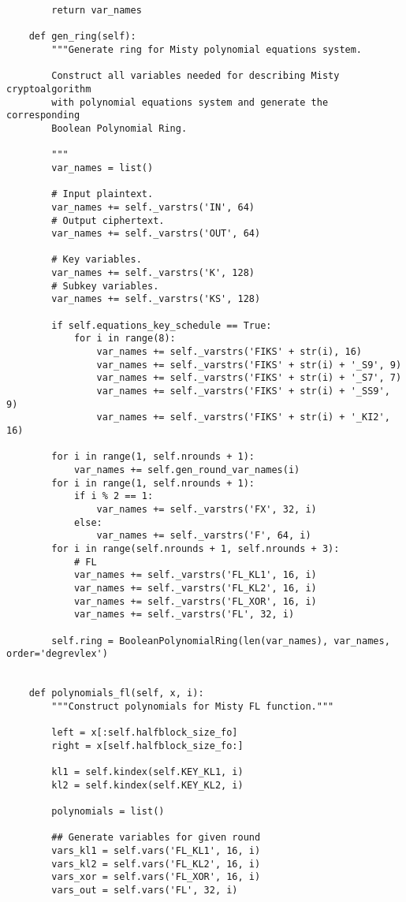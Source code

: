 \begin{lstlisting}
        return var_names

    def gen_ring(self):
        """Generate ring for Misty polynomial equations system.

        Construct all variables needed for describing Misty cryptoalgorithm
        with polynomial equations system and generate the corresponding
        Boolean Polynomial Ring.

        """
        var_names = list()

        # Input plaintext.
        var_names += self._varstrs('IN', 64)
        # Output ciphertext.
        var_names += self._varstrs('OUT', 64)

        # Key variables.
        var_names += self._varstrs('K', 128)
        # Subkey variables.
        var_names += self._varstrs('KS', 128)

        if self.equations_key_schedule == True:
            for i in range(8):
                var_names += self._varstrs('FIKS' + str(i), 16)
                var_names += self._varstrs('FIKS' + str(i) + '_S9', 9)
                var_names += self._varstrs('FIKS' + str(i) + '_S7', 7)
                var_names += self._varstrs('FIKS' + str(i) + '_SS9', 9)
                var_names += self._varstrs('FIKS' + str(i) + '_KI2', 16)

        for i in range(1, self.nrounds + 1):
            var_names += self.gen_round_var_names(i)
        for i in range(1, self.nrounds + 1):
            if i % 2 == 1:
                var_names += self._varstrs('FX', 32, i)
            else:
                var_names += self._varstrs('F', 64, i)
        for i in range(self.nrounds + 1, self.nrounds + 3):
            # FL
            var_names += self._varstrs('FL_KL1', 16, i)
            var_names += self._varstrs('FL_KL2', 16, i)
            var_names += self._varstrs('FL_XOR', 16, i)
            var_names += self._varstrs('FL', 32, i)

        self.ring = BooleanPolynomialRing(len(var_names), var_names, order='degrevlex')


    def polynomials_fl(self, x, i):
        """Construct polynomials for Misty FL function."""

        left = x[:self.halfblock_size_fo]
        right = x[self.halfblock_size_fo:]

        kl1 = self.kindex(self.KEY_KL1, i)
        kl2 = self.kindex(self.KEY_KL2, i)

        polynomials = list()

        ## Generate variables for given round
        vars_kl1 = self.vars('FL_KL1', 16, i)
        vars_kl2 = self.vars('FL_KL2', 16, i)
        vars_xor = self.vars('FL_XOR', 16, i)
        vars_out = self.vars('FL', 32, i)


\end{lstlisting}
